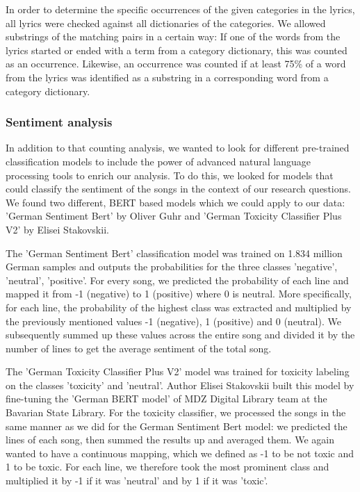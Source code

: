 In order to determine the specific occurrences of the given categories in the lyrics, all lyrics were checked against all dictionaries of the categories. We allowed substrings of the matching pairs in a certain way: If one of the words from the lyrics started or ended with a term from a category dictionary, this was counted as an occurrence. Likewise, an occurrence was counted if at least 75\% of a word from the lyrics was identified as a substring in a corresponding word from a category dictionary.

\subsubsection*{Sentiment analysis}

In addition to that counting analysis, we wanted to look for different pre-trained classification models to include the power of advanced natural language processing tools to enrich our analysis. To do this, we looked for models that could classify the sentiment of the songs in the context of our research questions. We found two different, BERT \cite{bert} based models which we could apply to our data: 'German Sentiment Bert' \cite{gbert} by Oliver Guhr and 'German Toxicity Classifier Plus V2' \cite{toxicity} by Elisei Stakovskii.

The 'German Sentiment Bert' classification model was trained on 1.834 million German samples and outputs the probabilities for the three classes 'negative', 'neutral', 'positive'. For every song, we predicted the probability of each line and mapped it from -1 (negative) to 1 (positive) where 0 is neutral. More specifically, for each line, the probability of the highest class was extracted and multiplied by the previously mentioned values -1 (negative), 1 (positive) and 0 (neutral). We subsequently summed up these values across the entire song and divided it by the number of lines to get the average sentiment of the total song.

The 'German Toxicity Classifier Plus V2' model was trained for toxicity labeling on the classes 'toxicity' and 'neutral'. Author Elisei Stakovskii built this model by fine-tuning the 'German BERT model' of MDZ Digital Library team at the Bavarian State Library. For the toxicity classifier, we processed the songs in the same manner as we did for the German Sentiment Bert model: we predicted the lines of each song, then summed the results up and averaged them. We again wanted to have a continuous mapping, which we defined as -1 to be not toxic and 1 to be toxic. For each line, we therefore took the most prominent class and multiplied it by -1 if it was 'neutral' and by 1 if it was 'toxic'.

